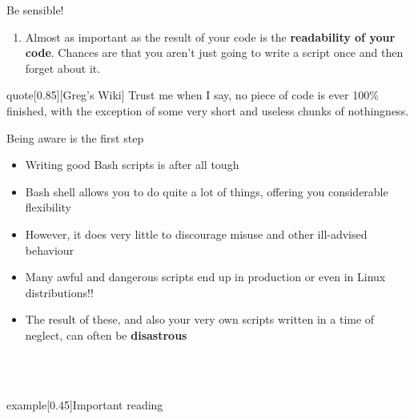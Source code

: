 \begin{frame}{Be sensible!}
{\begin{onlyenv}
\begin{enumerate}
                      Any script you'll find on the Web is likely to be broken in some way.
                      \alert{Do not copy/paste from them!}
                \item Almost as important as the result of your code is the \textbf{readability of your code}.
                      Chances are that you aren't just going to write a script once and then forget about it.
            \end{enumerate}
            \vspace{3mm}
            \begin{varblock}{quote}[0.85\textwidth]{}[Greg's Wiki]
                Trust me when I say, no piece of code is ever 100\% finished, with the exception of some very short and useless chunks of nothingness.
            \end{varblock}
        \end{onlyenv}
    }
\end{frame}
\begin{frame}{Being aware is the first step}
    \begin{itemize}
        \item Writing good Bash scripts is after all tough
        \item Bash shell allows you to do quite a lot of things, offering you considerable flexibility
        \item However, it does very little to discourage misuse and other ill-advised behaviour
        \item Many awful and dangerous scripts end up in production or even in Linux distributions!!
        \item The result of these, and also your very own scripts written in a time of neglect, can often be \textbf{disastrous}
    \end{itemize}
    \begin{lrbox}{\tmpbox}
        \begin{minipage}{0.85\textwidth}
            \\
            \\
        \end{minipage}
    \end{lrbox}
    \begin{varblock*}{example}[0.45\textwidth]{Important reading}
        \usebox{\tmpbox}
    \end{varblock*}
\end{frame}
